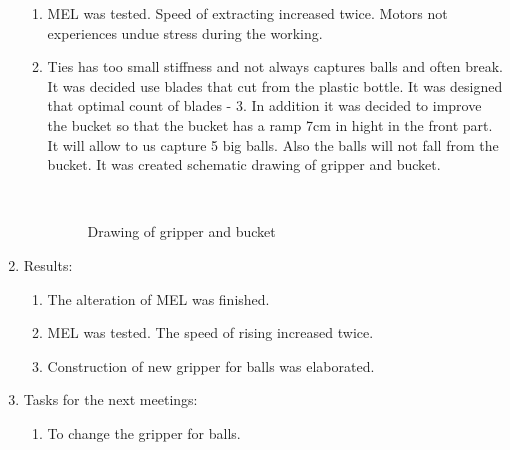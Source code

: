 \begin{enumerate}
\begin{enumerate}
		\item MEL was tested. Speed of extracting increased twice. Motors not experiences undue stress during the working.
		
		\item Ties has too small stiffness and not always captures balls and often break. It was decided use blades that cut from the plastic bottle. It was designed that optimal count of blades - 3. In addition it was decided to improve the bucket so that the bucket has a ramp 7cm in hight in the front part. It will allow to us capture 5 big balls. Also the balls will not fall from the bucket. It was created schematic drawing of gripper and bucket.
		
		\begin{figure}[H]
			\begin{minipage}[h]{0.2\linewidth}
				\center  
			\end{minipage}
			\begin{minipage}[h]{0.6\linewidth}
				\caption{Drawing of gripper and bucket}
			\end{minipage}
		\end{figure}
		
	\end{enumerate}
	
	\item Results:
	\begin{enumerate}
		\item The alteration of MEL was finished.
		
		\item MEL was tested. The speed of rising increased twice.
		
		\item Construction of new gripper for balls was elaborated.
		
	\end{enumerate}
	
	\item Tasks for the next meetings:
	\begin{enumerate}
		\item To change the gripper for balls.
		
	\end{enumerate}     
\end{enumerate}
\fillpage